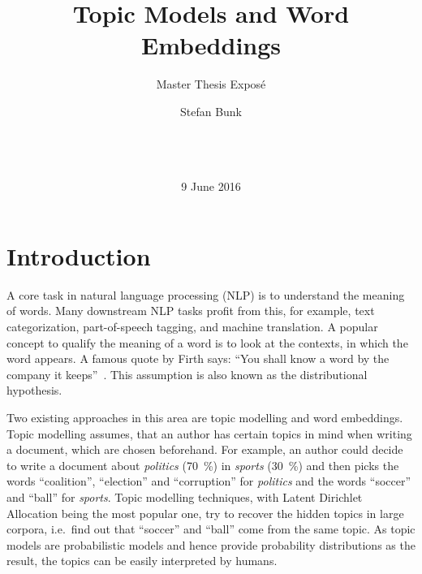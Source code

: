 \documentclass{sig-alternate-05-2015}
\begin{document}
\title{Topic Models and Word Embeddings}
\subtitle{Master Thesis Expos\'e}

\author{
\alignauthor
Stefan Bunk\\
       \\
       \\
       \\
}
\date{9 June 2016}

\maketitle

\section{Introduction}
A core task in natural language processing (NLP) is to understand the meaning of words.
Many downstream NLP tasks profit from this, for example, text categorization, part-of-speech tagging, and machine translation.
A popular concept to qualify the meaning of a word is to look at the contexts, in which the word appears.
A famous quote by Firth says: ``You shall know a word by the company it keeps''~\cite{Firth1957}.
This assumption is also known as the distributional hypothesis.

Two existing approaches in this area are topic modelling and word embeddings.
Topic modelling assumes, that an author has certain topics in mind when writing a document, which are chosen beforehand.
For example, an author could decide to write a document about \emph{politics} (70~\%) in \emph{sports} (30~\%) and then picks the words ``coalition'', ``election'' and ``corruption'' for \emph{politics} and the words ``soccer'' and ``ball'' for \emph{sports}.
Topic modelling techniques, with Latent Dirichlet Allocation being the most popular one, try to recover the hidden topics in large corpora, i.e.\ find out that ``soccer'' and ``ball'' come from the same topic.
As topic models are probabilistic models and hence provide probability distributions as the result, the topics can be easily interpreted by humans.
\end{document}
